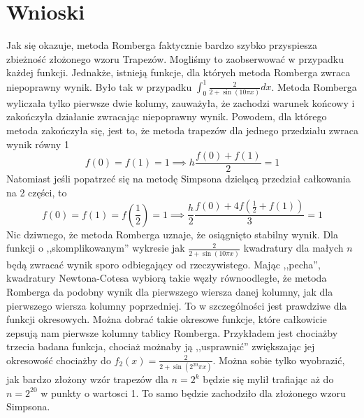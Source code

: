 \documentclass{article}
\begin{document}
\section{Wnioski}

Jak się okazuje, metoda Romberga faktycznie bardzo szybko przyspiesza zbieżność złożonego wzoru Trapezów.
Mogliśmy to zaobserwować w przypadku każdej funkcji.
\newline
\newline
Jednakże, istnieją funkcje, dla których metoda Romberga zwraca niepoprawny wynik. Było tak w przypadku
$\int_0^1 \frac{2}{2 + \sin(10 \pi x)} dx$. Metoda Romberga wyliczała tylko pierwsze dwie kolumy, zauważyła, że
zachodzi warunek końcowy i zakończyła działanie zwracając niepoprawny wynik. Powodem, dla którego
metoda zakończyła się, jest to, że metoda trapezów dla jednego przedziału zwraca wynik równy 1
\begin{equation*}
	f(0) = f(1) = 1 \implies h \frac{f(0) + f(1)}{2} = 1
\end{equation*}
Natomiast jeśli popatrzeć się na metodę Simpsona dzielącą przedział całkowania na 2 części, to
\begin{equation*}
	f(0) = f(1) = f(\frac{1}{2}) = 1 \implies \frac{h}{2} \frac{f(0) + 4f(\frac{1}{2} + f(1))}{3} = 1
\end{equation*}
Nic dziwnego, że metoda Romberga uznaje, że osiągnięto stabilny wynik.
\newline
\newline
Dla funkcji o ,,skomplikowanym'' wykresie jak $\frac{2}{2 + \sin(10 \pi x)}$ kwadratury dla małych $n$ będą zwracać wynik sporo
odbiegający od rzeczywistego. Mając ,,pecha'', kwadratury Newtona-Cotesa wybiorą takie węzły równoodległe,
że metoda Romberga da podobny wynik dla pierwszego wiersza danej kolumny, jak dla pierwszego wiersza kolumny poprzedniej.
\newline
\newline
To w szczególności jest prawdziwe dla funkcji okresowych. Można dobrać takie okresowe funkcje, które całkowicie zepsują nam pierwsze kolumny
tablicy Romberga. Przykładem jest chociażby trzecia badana funkcja, chociaż możnaby ją ,,usprawnić'' zwiększając jej
okresowość chociażby do $f_2(x) = \frac{2}{2 + \sin(2^{20} \pi x)}$. Można sobie tylko wyobrazić, jak bardzo
złożony wzór trapezów dla $n = 2^k$ będzie się mylił trafiając aż do $n = 2^{20}$ w punkty o wartosci 1. To samo
będzie zachodziło dla złożonego wzoru Simpsona.
\newline
\newline
\end{document}
